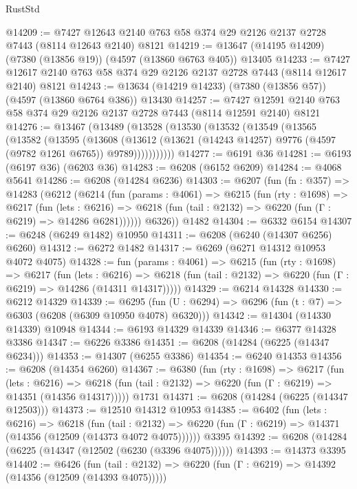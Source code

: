\begin{lexlean}{RustStd}
\begin{coremodule}
@14209 := @7427 @12643 @2140 @763 @58 @374 @29 @2126 @2137 @2728 @7443 (@8114 @12643 @2140) @8121
@14219 := @13647 (@14195 @14209) (@7380 (@13856 @19)) (@4597 (@13860 @6763 @405)) @13405
@14233 := @7427 @12617 @2140 @763 @58 @374 @29 @2126 @2137 @2728 @7443 (@8114 @12617 @2140) @8121
@14243 := @13634 (@14219 @14233) (@7380 (@13856 @57)) (@4597 (@13860 @6764 @386)) @13430
@14257 := @7427 @12591 @2140 @763 @58 @374 @29 @2126 @2137 @2728 @7443 (@8114 @12591 @2140) @8121
@14276 := @13467
    (@13489
      (@13528
        (@13530
          (@13532
            (@13549
              (@13565
                (@13582
                  (@13595
                    (@13608
                      (@13612
                        (@13621 (@14243 @14257) @9776 (@4597 (@9782 @1261 @6765)) @9789)))))))))))
@14277 := @6191 @36
@14281 := @6193 (@6197 @36) (@6203 @36)
@14283 := @6208 (@6152 @6209)
@14284 := @4068 @5641
@14286 := @6208 (@14284 @6236)
@14303 := @6207
    (fun (fn : @357) =>
    @14283
      (@6212
        (@6214
          (fun (params : @4061) =>
          @6215
            (fun (rty : @1698) =>
            @6217
              (fun (lets : @6216) =>
              @6218 (fun (tail : @2132) => @6220 (fun (Γ : @6219) => @14286 @6281))))))
        @6326))
    @1482
@14304 := @6332 @6154
@14307 := @6248 (@6249 @1482) @10950
@14311 := @6208 (@6240 (@14307 @6256) @6260)
@14312 := @6272 @1482
@14317 := @6269 (@6271 @14312 @10953 @4072 @4075)
@14328 := fun (params : @4061) =>
  @6215
    (fun (rty : @1698) =>
    @6217
      (fun (lets : @6216) =>
      @6218 (fun (tail : @2132) => @6220 (fun (Γ : @6219) => @14286 (@14311 @14317)))))
@14329 := @6214 @14328
@14330 := @6212 @14329
@14339 := @6295
    (fun (U : @6294) => @6296 (fun (t : @7) => @6303 (@6208 (@6309 @10950 @4078) @6320)))
@14342 := @14304 (@14330 @14339) @10948
@14344 := @6193 @14329 @14339
@14346 := @6377 @14328 @3386
@14347 := @6226 @3386
@14351 := @6208 (@14284 (@6225 (@14347 @6234)))
@14353 := @14307 (@6255 @3386)
@14354 := @6240 @14353
@14356 := @6208 (@14354 @6260)
@14367 := @6380
    (fun (rty : @1698) =>
    @6217
      (fun (lets : @6216) =>
      @6218 (fun (tail : @2132) => @6220 (fun (Γ : @6219) => @14351 (@14356 @14317)))))
    @1731
@14371 := @6208 (@14284 (@6225 (@14347 @12503)))
@14373 := @12510 @14312 @10953
@14385 := @6402
    (fun (lets : @6216) =>
    @6218
      (fun (tail : @2132) =>
      @6220 (fun (Γ : @6219) => @14371 (@14356 (@12509 (@14373 @4072 @4075))))))
    @3395
@14392 := @6208 (@14284 (@6225 (@14347 (@12502 (@6230 (@3396 @4075))))))
@14393 := @14373 @3395
@14402 := @6426
    (fun (tail : @2132) => @6220 (fun (Γ : @6219) => @14392 (@14356 (@12509 (@14393 @4075)))))

\end{coremodule}
\end{lexlean}
